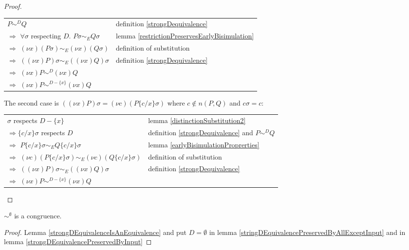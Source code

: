 \begin{lemma}
\begin{proof}
\begin{description}
	\begin{center}
	  \begin{tabular}{ll}
	      $P \sim^{D} Q$
	    &
	      definition \ref{strongDequivalence}
	  \\
	      $\Rightarrow$ $\forall \sigma$ respecting $D.$ $P\sigma \sim_{E} Q\sigma$
	    &
	      lemma \ref{restrictionPreservesEarlyBisimulation}
	  \\
	      $\Rightarrow$ $(\nu x)(P\sigma) \sim_{E} (\nu x)(Q\sigma)$
	    &
	      definition of substitution 
	  \\
	      $\Rightarrow$ $((\nu x)P)\sigma \sim_{E} ((\nu x)Q)\sigma$
	    &
	      definition \ref{strongDequivalence}
	  \\
	      $\Rightarrow$ $(\nu x)P \sim^{D} (\nu x)Q$
	    &
 	  \\
 	      $\Rightarrow$ $(\nu x)P \sim^{D-\{x\}} (\nu x)Q$
 	    &
	  \end{tabular}
	\end{center}		
	The second case is $((\nu x) P)\sigma=(\nu c)(P\{c/x\}\sigma)$ where $c\notin n(P,Q)$ and $c \sigma = c$:
	\begin{center}
	  \begin{tabular}{ll}
 	      $\sigma$ respects $D-\{x\}$
 	    &
 	      lemma \ref{distinctionSubstitution2}
 	  \\
 	      $\Rightarrow \{c/x\}\sigma$ respects $D$
 	    &
 	      definition \ref{strongDequivalence} and $P \sim^{D} Q$
 	  \\
 	      $\Rightarrow$ $P\{c/x\}\sigma \sim_{E} Q\{c/x\}\sigma$
 	    &
 	      lemma \ref{earlyBisimulationProprerties}
 	  \\
 	      $\Rightarrow$ $(\nu c)(P\{c/x\}\sigma) \sim_{E} (\nu c)(Q\{c/x\}\sigma)$
 	    &
 	      definition of substitution 
 	  \\
 	      $\Rightarrow$ $((\nu x)P)\sigma \sim_{E} ((\nu x)Q)\sigma$
 	    &
 	      definition \ref{strongDequivalence}
 	  \\
 	      $\Rightarrow$ $(\nu x)P \sim^{D-\{x\}} (\nu x)Q$
 	    &
 	  \end{tabular}
 	\end{center}		
    \end{description}
  \end{proof}
\end{lemma}



\begin{theorem}
  $\sim^{\emptyset}$ is a congruence.
  \begin{proof}
    Lemma \ref{strongDEquivalenceIsAnEquivalence} and put $D=\emptyset$ in lemma \ref{stringDEquivalencePreservedByAllExceptInput} and in lemma \ref{strongDEquivalencePreservedByInput}
  \end{proof}
\end{theorem}


